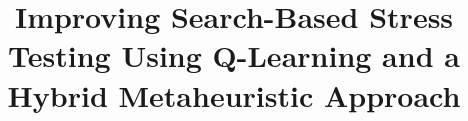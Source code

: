 \documentclass{bmcart}
\begin{document}
\begin{frontmatter}

\begin{fmbox}


\title{Improving Search-Based Stress Testing Using Q-Learning and a Hybrid Metaheuristic Approach}


\author[
   addressref={aff1},                   %
   corref={aff1},                       %
   noteref={n1},                        %
   email={naubergois@gmail.com}   %
]{ }
\author[
   addressref={aff1},
   email={porfirio@unifor.br}
]{ }
\author[
   addressref={aff1},
   email={acoelho@unifor.br}
]{ }



\address[id=aff1]{%
  , %
  ,                     %
  ,                              %
}


\end{fmbox}
\end{frontmatter}
\end{document}
